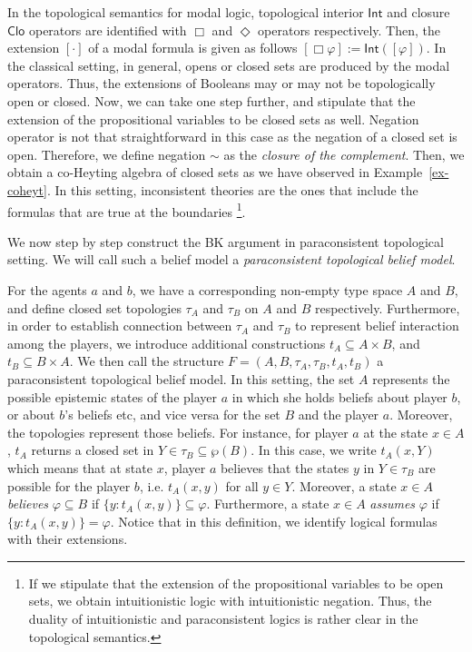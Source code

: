\documentclass{article}
\begin{document}
In the topological semantics for modal logic, topological interior $\mathsf{Int}$ and closure $\mathsf{Clo}$ operators are identified with $\Box$ and $\Diamond$ operators respectively. Then, the extension $[\cdot]$ of a modal formula is given as follows $[\Box \varphi] := \mathsf{Int}([\varphi])$. In the classical setting, in general, opens or closed sets are produced by the modal operators. Thus, the extensions of Booleans may or may not be topologically open or closed. Now, we can take one step further, and stipulate that the extension of the propositional variables to be closed sets as well. Negation operator is not that straightforward in this case as the negation of a closed set is open. Therefore, we define negation ${{\sim}}$ as the \emph{closure of the complement}. Then, we obtain a co-Heyting algebra of closed sets as we have observed in Example~\ref{ex-coheyt}. In this setting, inconsistent theories are the ones that include the formulas that are true at the boundaries \cite{mor,bas3}\footnote{If we stipulate that the extension of the propositional variables to be open sets, we obtain intuitionistic logic with intuitionistic negation. Thus, the duality of intuitionistic and paraconsistent logics is rather clear in the topological semantics.}.

We now step by step construct the BK argument in paraconsistent topological setting. We will call such a belief model a \emph{paraconsistent topological belief model}.

For the agents $a$ and $b$, we have a corresponding non-empty type space $A$ and $B$, and define closed set topologies $\tau_A$ and $\tau_B$ on $A$ and $B$ respectively. Furthermore, in order to establish connection between $\tau_A$ and $\tau_B$ to represent belief interaction among the players, we introduce additional constructions $t_A \subseteq A \times B$, and  $t_B \subseteq B \times A$. We then call the structure $F = (A, B, \tau_A, \tau_B, t_A, t_B)$ a paraconsistent topological belief model. In this setting, the set $A$ represents the possible epistemic states of the player $a$ in which she holds beliefs about player $b$, or about $b$'s beliefs etc, and vice versa for the set $B$ and the player $a$. Moreover, the topologies represent those beliefs. For instance, for player $a$ at the state $x \in A$, $t_A$ returns a closed set in $Y \in \tau_B \subseteq \wp{(B)}$. In this case, we write $t_A(x, Y)$ which means that at state $x$, player $a$ believes that the states $y$ in $Y \in \tau_B$ are possible for the player $b$, i.e. $t_A(x, y)$ for all $y \in Y$. Moreover, a state $x \in A$ \emph{believes} $\varphi \subseteq B$ if $\{ y : t_A(x, y) \} \subseteq \varphi$. Furthermore, a state $x \in A$ \emph{assumes} $\varphi$ if $\{ y : t_A(x, y) \} = \varphi$. Notice that in this definition, we identify logical formulas with their extensions.
\end{document}
